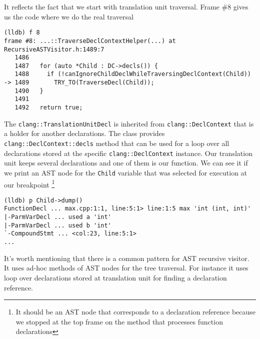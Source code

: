 It reflects the fact that we start with translation unit traversal. Frame \#8
 gives us the code where we do the real traversal
\begin{adjustwidth}{0em}{0em}
\begin{verbatim}
(lldb) f 8
frame #8: ...::TraverseDeclContextHelper(...) at RecursiveASTVisitor.h:1489:7
   1486 
   1487   for (auto *Child : DC->decls()) {
   1488     if (!canIgnoreChildDeclWhileTraversingDeclContext(Child))
-> 1489       TRY_TO(TraverseDecl(Child));
   1490   }
   1491 
   1492   return true;
\end{verbatim}
\end{adjustwidth}
The \texttt{clang::TranslationUnitDecl} is inherited from
\texttt{clang::DeclContext} that is a holder for another
declarations. The class provides \texttt{clang::DeclContext::decls}
method that can be used for a loop over all declarations stored at the specific
\texttt{clang::DeclContext} instance. Our translation unit keeps
several declarations and one of them is our function. We can see it if we print
an AST node for the \texttt{Child} variable that was selected
for execution at our breakpoint
\footnote{
It should be an AST node that corresponds to a declaration reference because we
stopped at the top frame on the method that processes function declarations
}
\begin{adjustwidth}{0em}{0em}
\begin{verbatim}
(lldb) p Child->dump()
FunctionDecl ... max.cpp:1:1, line:5:1> line:1:5 max 'int (int, int)'
|-ParmVarDecl ... used a 'int'
|-ParmVarDecl ... used b 'int'
`-CompoundStmt ... <col:23, line:5:1>
...
\end{verbatim}
\end{adjustwidth}

It's worth mentioning that there is a common pattern for AST recursive
visitor. It uses ad-hoc methods of AST nodes for the tree traversal. For
instance it uses loop over declarations stored at translation unit for finding a
declaration reference.


